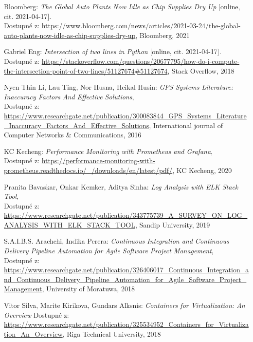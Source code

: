 \documentclass[czech, bachelor]{diploma}
\begin{document}
\begin{thebibliography}{50}
Bloomberg: \textit{The Global Auto Plants Now Idle as Chip Supplies Dry Up} [online, cit. 2021-04-17]. \\
Dostupné z:
\url{https://www.bloomberg.com/news/articles/2021-03-24/the-global-auto-plants-now-idle-as-chip-supplies-dry-up},
Bloomberg, 2021

Gabriel Eng: \textit{Intersection of two lines in Python} [online, cit. 2021-04-17]. \\
Dostupné z:
\url{https://stackoverflow.com/questions/20677795/how-do-i-compute-the-intersection-point-of-two-lines/51127674\#51127674},
Stack Overflow, 2018

Nyen Thin Li, Lau Ting, Nor Husna, Heikal Husin: \textit{GPS Systems Literature: Inaccuracy Factors And Effective Solutions}, \\
Dostupné z:
\url{https://www.researchgate.net/publication/300083844\_GPS\_Systems\_Literature\_Inaccuracy\_Factors\_And\_Effective\_Solutions},
International journal of Computer Networks \& Communications, 2016

KC Kecheng: \textit{Performance Monitoring with Prometheus and Grafana}, \\
Dostupné z:
\url{https://performance-monitoring-with-prometheus.readthedocs.io/\_/downloads/en/latest/pdf/},
KC Kecheng, 2020

Pranita Bavaskar, Onkar Kemker, Aditya Sinha: \textit{Log Analysis with ELK Stack Tool}, \\
Dostupné z:
\url{https://www.researchgate.net/publication/343775739\_A\_SURVEY\_ON\_LOG\_ANALYSIS\_WITH\_ELK\_STACK\_TOOL},
Sandip University, 2019

S.A.I.B.S. Arachchi, Indika Perera: \textit{Continuous Integration and Continuous Delivery Pipeline Automation for Agile Software
Project Management}, \\
Dostupné z:
\url{https://www.researchgate.net/publication/326406017\_Continuous\_Integration\_and\_Continuous\_Delivery\_Pipeline\_Automation\_for\_Agile\_Software\_Project\_Management},
University of Moratuwa, 2018

Vitor Silva, Marite Kirikova, Gundars Alksnis: \textit{Containers for Virtualization: An Overview}
Dostupné z:
\url{https://www.researchgate.net/publication/325534952\_Containers\_for\_Virtualization\_An\_Overview},
Riga Technical University, 2018


\end{thebibliography}
\end{document}
